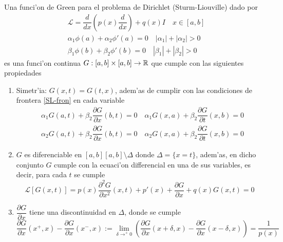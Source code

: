 \documentclass[main.tex]{subfiles}
\begin{document}
\begin{def.}
Una funci'on de Green para el problema de Dirichlet (Sturm-Liouville) dado por
\begin{align*}
  &\mathcal{L}=\dfrac{d}{dx}\left(p(x)\dfrac{d}{dx}\right)+q(x)I\quad x\in[a,b]\\
  &\alpha_{1}\phi(a)+\alpha_{2}\phi'(a)=0\quad|\alpha_{1}|+|\alpha_{2}|>0\\
  &\beta_{1}\phi(b)+\beta_{2}\phi'(b)=0\quad|\beta_{1}|+|\beta_{2}|>0
\end{align*}
es una funci'on continua $G:[a,b]\times[a,b]\to\mathbb R $ que cumple con las siguientes propiedades
\begin{enumerate}
\item Simetr'ia: $G(x,t)=G(t,x)$, adem'as de cumplir con las condiciones de frontera \ref{SL-fron} en cada variable
\begin{align*}\label{Green-fron}
  &\alpha_{1}G(a,t)+\beta_{2}\dfrac{\partial G}{\partial x}(b,t)=0\quad\alpha_{1}G(x,a)+\beta_{2}\dfrac{\partial G}{\partial t}(x,b)=0\\
  &\alpha_{2}G(a,t)+\beta_{2}\dfrac{\partial G}{\partial x}(b,t)=0\quad\alpha_{2}G(x,a)+\beta_{2}\dfrac{\partial G}{\partial t}(x,b)=0
\end{align*}
  \item $G$ es diferenciable en $[a,b][a,b]\setminus\Delta$ donde $\Delta=\{x=t\}$, adem'as, en dicho conjunto $G$ cumple con la ecuaci'on differencial en una de sus variables, es decir, para cada $t$ se cumple
  \[
    \mathcal{L}[G(x,t)]=p(x)\dfrac{\partial^{2} G}{\partial x^{2}}(x,t)+p'(x) + \dfrac{\partial G}{\partial x}+q(x)G(x,t)=0
  \]
  \item $\dfrac{\partial G}{\partial x}$ tiene una discontinuidad en $\Delta$, donde se cumple
        \begin{equation}
          \dfrac{\partial G}{\partial x}(x^{+},x)-\dfrac{\partial G}{\partial x}(x^{-},x):=\lim_{\delta\to^{+}0}\left(\dfrac{\partial G}{\partial x}(x+\delta,x)-\dfrac{\partial G}{\partial x}(x-\delta,x)\right)=\frac{1}{p(x)}
          \end{equation}
\end{enumerate}
\end{def.}
\end{document}
